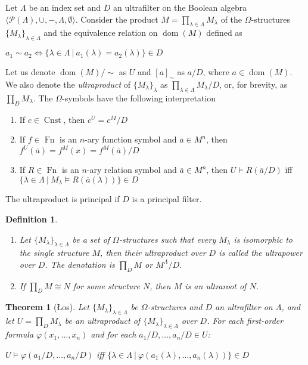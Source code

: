 \documentclass[a4paper]{article}
\theoremstyle{defin}
\newtheorem{defin}{Definition}
\theoremstyle{theorem}
\newtheorem{theorem}{Theorem}
\theoremstyle{prop}
\theoremstyle{lemma}
\theoremstyle{fact}
\theoremstyle{ex}
\theoremstyle{col}
\begin{document}
Let $\Lambda$ be an index set and $D$ an ultrafilter on the Boolean algebra $\langle \mathcal{P}(\Lambda), \cup, -, \Lambda, \emptyset \rangle$. Consider the product $M = \prod \limits_{\lambda \in \Lambda} M_{\lambda}$ of the $\Omega$-structures $\{ M_{\lambda}\}_{\lambda \in \Lambda}$ and the equivalence relation on $\operatorname{dom}(M)$ defined as
\begin{center}
  $a_1 \sim a_2 \Leftrightarrow \{ \lambda \in \Lambda \: | \: a_1(\lambda) = a_2(\lambda)\} \in D$
\end{center}
Let us denote $\operatorname{dom}(M) / \sim$ as $U$ and $[a]_{\sim}$ as $a / D$, where $a \in \operatorname{dom}(M)$. We also denote the \emph{ultraproduct} of $\{ M_{\lambda} \}_{\lambda}$ as $\prod \limits_{\lambda \in \Lambda} M_{\lambda} / D$, or,
for brevity, as $\prod_{D} M_{\lambda}$. The $\Omega$-symbols have the following interpretation
\begin{enumerate}
  \item If $c \in \operatorname{Cnst}$, then $c^{U} = c^{M} / D$
  \item If $f \in \operatorname{Fn}$ is an $n$-ary function symbol and $\overline{a} \in M^{n}$, then $f^{U}(\overline{a}) = f^{M}(x) = f^{M}(\overline{a}) / D$
  \item If $R \in \operatorname{Fn}$ is an $n$-ary relation symbol and $\overline{a} \in M^{n}$, then $U \models R(\overline{a} / D)$ iff
  $\{ \lambda \in \Lambda \: | \: M_{\lambda} \models R(\overline{a} (\lambda))\} \in D$
\end{enumerate}
The ultraproduct is principal if $D$ is a principal filter.

\begin{defin}
$ $

  \begin{enumerate}
    \item Let $\{ M_{\lambda}\}_{\lambda \in \Lambda}$ be a set of $\Omega$-structures such that every
    $M_{\lambda}$ is isomorphic to the single structure $M$, then their ultraproduct over $D$ is called the ultrapower over $D$.
    The denotation is $\prod \limits_{D} M$ or $M^{\Lambda} / D$.
    \item If $\prod \limits_{D} M \cong N$ for some structure $N$, then $M$ is an ultraroot of $N$.
  \end{enumerate}
\end{defin}

\begin{theorem}[\L{}os]

  Let $\{ M_{\lambda}\}_{\lambda \in \Lambda}$ be $\Omega$-structures and $D$ an ultrafilter on $\Lambda$, and let
  $U = \prod \limits_{D} M_{\lambda}$ be an ultraproduct of $\{ M_{\lambda}\}_{\lambda \in \Lambda}$ over $D$. For each first-order formula
  $\varphi(x_1, \dots, x_n)$ and for each $a_1 / D, \dots, a_n / D \in U$:

\begin{center}
  $U \models \varphi(a_1 / D, \dots, a_n / D)$ iff $\{ \lambda \in \Lambda \: | \: \varphi(a_1(\lambda), \dots, a_n(\lambda))\} \in D$
\end{center}
\end{theorem}
\end{document}
